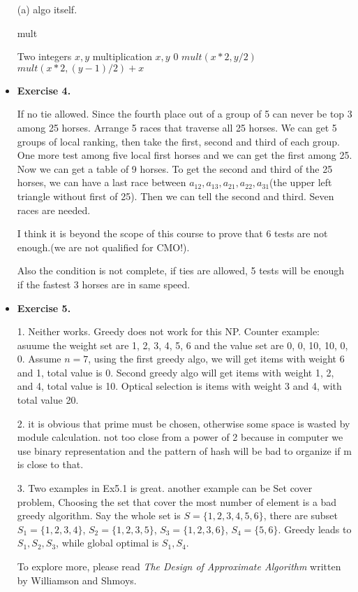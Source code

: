 \documentclass{article}
\begin{document}
\begin{itemize}
(a) algo itself.
\begin{algorithm}[H]  
    \caption{mult}  
    \begin{algorithmic}[1]  
        \Require Two integers $x,y$ 
        \Ensure multiplication
             {$x,y$}
                    \State \Return $0$
                \Else
                        \State \Return $mult(x*2,y/2)$
                    \Else
                        \State \Return $mult(x*2,(y-1)/2)+x$
                    \EndIf
                \EndIf
            \EndFunction  
    \end{algorithmic}  
\end{algorithm}

\item \textbf{Exercise 4.}

If no tie allowed. Since the fourth place out of a group of 5 can never be top 3 among 25 horses. Arrange 5 races that traverse all 25 horses.  We can get 5 groups of local ranking, then take the first, second and third of each group. One more test among five local first horses and we can get the first among 25. Now we can get a table of 9 horses. To get the second and third of the 25 horses, we can have a last race between $a_{12}, a_{13}, a_{21}, a_{22}, a_{31}$(the upper left triangle without first of 25). Then we can tell the second and third. Seven races are needed.

I think it is beyond the scope of this course to prove that 6 tests are not enough.(we are not qualified for CMO!). 

Also the condition is not complete, if ties are allowed, 5 tests will be enough if the fastest 3 horses are in same speed.

\item \textbf{Exercise 5.}

1. Neither works. Greedy does not work for this NP. Counter example: asuume the weight set are {1, 2, 3, 4, 5, 6} and the value set are {0, 0, 10, 10, 0, 0}. Assume $n = 7$, using the first greedy algo, we will get items with weight 6 and 1, total value is 0. Second greedy algo will get items with weight 1, 2, and 4, total value is 10. Optical selection is items with weight 3 and 4, with total value 20.

2. it is obvious that prime must be chosen, otherwise some space is wasted by module calculation. not too close from a power of 2 because in computer we use binary representation and the pattern of hash will be bad to organize if m is close to that.

3. Two examples in Ex5.1 is great. another example can be Set cover problem, Choosing the set that cover the most number of element is a bad greedy algorithm. Say the whole set is $S = \{1,2,3,4,5,6\}$, there are subset $S_1 = \{ 1,2,3,4 \}$, $S_2 = \{ 1,2,3,5 \}$, $S_3 = \{ 1,2,3,6 \}$, $S_4 = \{ 5, 6 \}$. Greedy leads to $S_1,S_2, S_3$, while global optimal is $S_1, S_4$.

To explore more, please read  \textit{The Design of Approximate Algorithm} written by Williamson and Shmoys.


\end{itemize}

\end{document}
